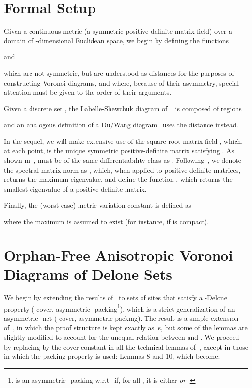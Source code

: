 \documentclass[11pt]{article}
\begin{document}
 
\section{Formal Setup}

Given a continuous metric  (a symmetric positive-definite matrix field) over a domain  of -dimensional Euclidean space, 
	we begin by defining the functions 
	
	and
	
which are not symmetric, but are understood as distances for the purposes of constructing Voronoi diagrams, and where, because of their asymmetry, special attention must be given to the order of their arguments. 
	
Given a discrete set , the Labelle-Shewchuk diagram of ~\cite{LS} is composed of regions

and an analogous definition of a Du/Wang diagram~\cite{DW} uses the distance  instead. 

In the sequel, we will make extensive use of the square-root matrix field , which, at each point, is the unique symmetric positive-definite matrix satisfying . 
As shown in~\cite{avd},  must be of the same differentiability class as . 
Following~\cite{avd}, we denote the spectral matrix norm  as , which, when applied to positive-definite matrices, returns the maximum eigenvalue, and 
define the function , which returns the smallest eigenvalue of a positive-definite matrix. 

Finally, the (worst-case) metric variation constant  is defined as

where the maximum is assumed to exist (for instance, if  is compact). 






\section{Orphan-Free Anisotropic Voronoi Diagrams of Delone Sets}

We begin by extending the results of~\cite{avd} to sets of sites that satisfy a -Delone property (-cover, asymmetric -packing\footnote{ is an asymmetric -packing w.r.t.\  if, for all , it is either  \emph{or} .}), 
	which is a strict generalization of an asymmetric -net (-cover, asymmetric  packing). 
The result is a simple extension of~\cite{avd}, in which the proof structure is kept exactly as is, 
	but some of the lemmas are slightly modified to account for the unequal relation between  and . 
We proceed by replacing  by the cover constant  in all the technical lemmas of~\cite{avd}, 
	except in those in which the packing property is used: Lemmas 8 and 10, which become:
	
\end{document}
